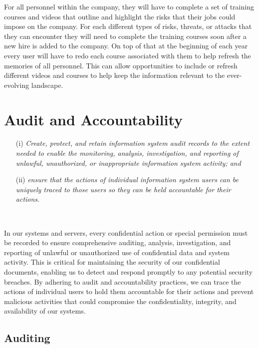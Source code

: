 \documentclass[12pt,a4paper]{report}
\begin{document}
For all personnel within the company, they will have to complete a set of training courses and videos that outline and highlight the risks that their jobs could impose on the company.
For each different types of risks, threats, or attacks that they can encounter they will need to complete the training courses soon after a new hire is added to the company.
On top of that at the beginning of each year every user will have to redo each course associated with them to help refresh the memories of all personnel.
This can allow opportunities to include or refresh different videos and courses to help keep the information relevant to the ever-evolving landscape.

\chapter{Audit and Accountability}
\begin{enumerate}
 \item[(i)] \textit{Create, protect, and retain information system audit records to the extent needed to enable the monitoring, analysis, investigation, and reporting of unlawful, unauthorized, or inappropriate information system activity; and}
 \item[(ii)] \textit{ensure that the actions of individual information system users can be uniquely traced to those users so they can be held accountable for their actions.}
\end{enumerate}

\

In our systems and servers, every confidential action or special permission must be recorded to ensure comprehensive auditing, analysis, investigation, and reporting of unlawful or unauthorized use of confidential data and system activity.
This is critical for maintaining the security of our confidential documents, enabling us to detect and respond promptly to any potential security breaches. 
By adhering to audit and accountability practices, we can trace the actions of individual users to hold them accountable for their actions and prevent malicious activities that could compromise the confidentiality, integrity, and availability of our systems.

\section{Auditing}
\
\end{document}
